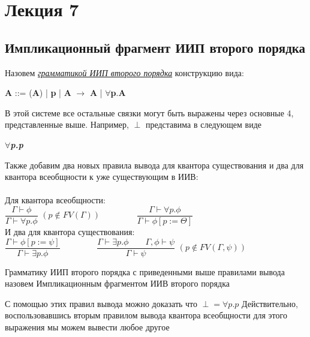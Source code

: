 \section{Лекция 7}
	\subsection{Импликационный фрагмент ИИП второго порядка}
 	\begin{center}
 		\begin{definition}
 			\large Назовем \textit{\underline{грамматикой ИИП второго порядка}} конструкцию вида: 
 		\end{definition}
 	\textbf{A} ::= 
 	(\textbf{A}) |
 	\textbf{p} |
 	\textbf{A} $\rightarrow$ \textbf{A} |
 	$\forall$\textbf{p}.\textbf{A} 
 	
 	\end{center}
 
 	\large В этой системе все остальные связки могут быть выражены через основные 4, представленные выше. Например, $\perp$ представима в следующем виде
 	\begin{center}
 		{\textbf{\textsl\textit{\large $\forall$p.p}}} \\
 	\end{center}
 	
 	
 	 Также добавим два новых правила вывода для квантора существования и два для квантора всеобщности к уже существующим в ИИВ: \\ \\
 	
	Для квантора всеобщности: \\ 
 	
 	\Large{$\dfrac{\Gamma\vdash\phi}{\Gamma\vdash\forall p.\phi}$} \Large$(p\notin FV(\Gamma)) \qquad\qquad$ 
 	\Large{$\dfrac{\Gamma\vdash\forall p.\phi}{\Gamma\vdash\phi[p:=\Theta]}$}	\\
 	
 	 И два для квантора существования: \\
 	
 	\Large{$\dfrac{\Gamma\vdash\phi[p:= \psi]}{\Gamma\vdash\exists p.\phi}\qquad\qquad$} 
 	\Large{$\dfrac{\Gamma\vdash\exists p.\phi\qquad\Gamma, \phi\vdash\psi}{\Gamma\vdash\psi}$} \Large$(p\notin FV(\Gamma, \psi))$ \\ 
 	
 	
 	\begin{definition}
 		\large Грамматику ИИП второго порядка с приведенными выше правилами вывода назовем Импликационным фрагментом ИИВ второго порядка\\ 
 	\end{definition}
 	\large {С помощью этих правил вывода можно доказать что \textbf{${\perp = \forall p.p}$}
 		Действительно, воспользовавшись вторым правилом вывода квантора всеобщности для этого выражения мы можем вывести любое другое}
 	
